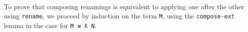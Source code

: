 \begin{fence}
\begin{code}
\AgdaSpace{}%
\AgdaSymbol{\}}\<%
\\
\>[.][@{}l@{}]\<[1672I]%
\>[14]\AgdaSpace{}%
\AgdaSymbol{((}\AgdaSpace{}%
\AgdaSymbol{)}\AgdaSpace{}%
\AgdaSpace{}%
\AgdaSymbol{(}\AgdaSpace{}%
\AgdaSymbol{))}\AgdaSpace{}%
\AgdaSpace{}%
\AgdaSpace{}%
\AgdaSpace{}%
\AgdaSymbol{(}\AgdaSpace{}%
\AgdaSpace{}%
\AgdaSymbol{)}\AgdaSpace{}%
\<%
\\
%
\>[2]\AgdaSpace{}%
\AgdaSymbol{\{}\AgdaSpace{}%
\AgdaSymbol{=}\AgdaSpace{}%
\AgdaSymbol{\}}\AgdaSpace{}%
\AgdaSymbol{=}\AgdaSpace{}%
\<%
\\
%
\>[2]\AgdaSpace{}%
\AgdaSymbol{\{}\AgdaSpace{}%
\AgdaSymbol{=}\AgdaSpace{}%
\AgdaSpace{}%
\AgdaSymbol{\}}\AgdaSpace{}%
\AgdaSymbol{=}\AgdaSpace{}%
\<%
\end{code}
\end{fence}

To prove that composing renamings is equivalent to applying one after
the other using \texttt{rename}, we proceed by induction on the term
\texttt{M}, using the \texttt{compose-ext} lemma in the case for
\texttt{M\ ≡\ ƛ\ N}.


